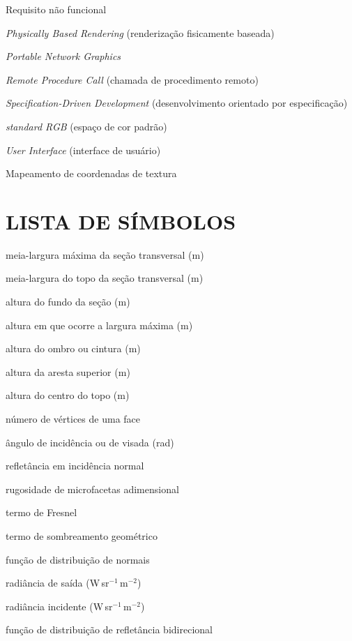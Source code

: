 \begin{abrev}
  \item[NFR] Requisito n\~ao funcional
  \item[PBR] \emph{Physically Based Rendering} (renderiza\c{c}\~ao fisicamente baseada)
  \item[PNG] \emph{Portable Network Graphics}
  \item[RPC] \emph{Remote Procedure Call} (chamada de procedimento remoto)
  \item[SDD] \emph{Specification-Driven Development} (desenvolvimento orientado por especifica\c{c}\~ao)
  \item[sRGB] \emph{standard RGB} (espa\c{c}o de cor padr\~ao)
  \item[UI] \emph{User Interface} (interface de usu\'ario)
  \item[UV] Mapeamento de coordenadas de textura
\end{abrev}

\clearpage

\chapter*{LISTA DE S\'IMBOLOS}
\thispagestyle{plain}

\begin{simb}
  \item[$w$] meia-largura m\'axima da se\c{c}\~ao transversal (m)
  \item[$w_t$] meia-largura do topo da se\c{c}\~ao transversal (m)
  \item[$z_b$] altura do fundo da se\c{c}\~ao (m)
  \item[$z_m$] altura em que ocorre a largura m\'axima (m)
  \item[$z_s$] altura do ombro ou cintura (m)
  \item[$z_{te}$] altura da aresta superior (m)
  \item[$z_t$] altura do centro do topo (m)
  \item[$n$] n\'umero de v\'ertices de uma face
  \item[$\theta$] \^angulo de incid\^encia ou de visada (rad)
  \item[$f_0$] reflet\^ancia em incid\^encia normal
  \item[$\alpha$] rugosidade de microfacetas adimensional
  \item[$F$] termo de Fresnel
  \item[$G$] termo de sombreamento geom\'etrico
  \item[$D$] fun\c{c}\~ao de distribui\c{c}\~ao de normais
  \item[$L_o$] radi\^ancia de sa\'ida (W\,sr$^{-1}$\,m$^{-2}$)
  \item[$L_i$] radi\^ancia incidente (W\,sr$^{-1}$\,m$^{-2}$)
  \item[$\rho$] fun\c{c}\~ao de distribui\c{c}\~ao de reflet\^ancia bidirecional
\end{simb}

\clearpage
